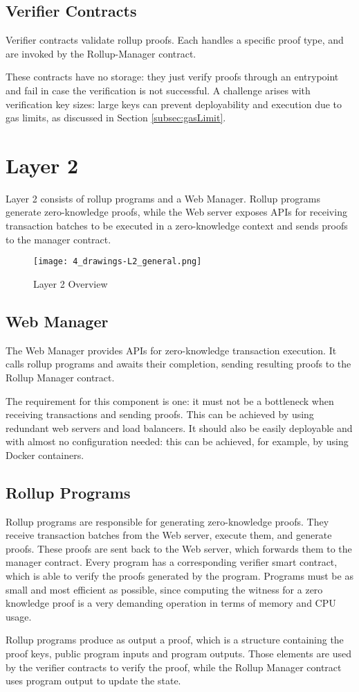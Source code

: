 \subsection{Verifier Contracts\label{sec:designverifiercontracts}}
Verifier contracts validate rollup proofs. Each handles a specific proof type, and are invoked by the Rollup-Manager contract.

These contracts have no storage: they just verify proofs through an entrypoint and fail in case the verification is not successful. A challenge arises with verification key sizes: large keys can prevent deployability and execution due to gas limits, as discussed in Section \ref{subsec:gasLimit}.

\section{Layer 2\label{sec:designLayer2}}
Layer 2 consists of rollup programs and a Web Manager. Rollup programs generate zero-knowledge proofs, while the Web server exposes APIs for receiving transaction batches to be executed in a zero-knowledge context and sends proofs to the manager contract.

\begin{figure}[htb]
  \centering
  \texttt{[image: 4\_drawings-L2\_general.png]}
  \caption{Layer 2 Overview}
  \label{fig:Layer2overview}
\end{figure}

\subsection{Web Manager\label{sec:designwebserver}}
The Web Manager provides APIs for zero-knowledge transaction execution. It calls rollup programs and awaits their completion, sending resulting proofs to the Rollup Manager contract.

The requirement for this component is one: it must not be a bottleneck when receiving transactions and sending proofs. This can be achieved by using redundant web servers and load balancers. It should also be easily deployable and with almost no configuration needed: this can be achieved, for example, by using Docker containers.

\subsection{Rollup Programs\label{sec:designrollupprograms}}
Rollup programs are responsible for generating zero-knowledge proofs. They receive transaction batches from the Web server, execute them, and generate proofs. These proofs are sent back to the Web server, which forwards them to the manager contract. Every program has a corresponding verifier smart contract, which is able to verify the proofs generated by the program. Programs must be as small and most efficient as possible, since computing the witness for a zero knowledge proof is a very demanding operation in terms of memory and CPU usage.

Rollup programs produce as output a proof, which is a structure containing the proof keys, public program inputs and program outputs. Those elements are used by the verifier contracts to verify the proof, while the Rollup Manager contract uses program output to update the state.
